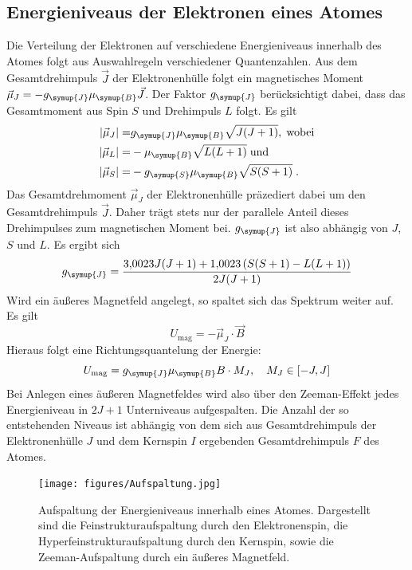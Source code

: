 \subsection{Energieniveaus der Elektronen eines Atomes}
%
Die Verteilung der Elektronen auf verschiedene Energieniveaus innerhalb des
Atomes folgt aus Auswahlregeln verschiedener Quantenzahlen. Aus dem
Gesamtdrehimpuls $\vec{J}$ der Elektronenhülle folgt ein magnetisches Moment
$\vec{\mu}_J=-g_{\symup{J}}\mu_{\symup{B}}\vec{J}$. Der Faktor $g_{\symup{J}}$
berücksichtigt dabei, dass das Gesamtmoment aus Spin $S$ und Drehimpuls $L$
folgt. Es gilt
%
\begin{align*}
  |\vec{\mu}_J|=&g_{\symup{J}}\mu_{\symup{B}}\sqrt{J(J+1)},\;\text{wobei} \\
  |\vec{\mu}_L|=&-\mu_{\symup{B}}\sqrt{L(L+1)}\;\text{und} \\
  |\vec{\mu}_S|=&-g_{\symup{S}}\mu_{\symup{B}}\sqrt{S(S+1)}\;.
\end{align*}
%
Das Gesamtdrehmoment $\vec{\mu}_J$ der Elektronenhülle präzediert dabei um den
Gesamtdrehimpuls $\vec{J}$. Daher trägt stets nur der parallele Anteil dieses
Drehimpulses zum magnetischen Moment bei. $g_{\symup{J}}$ ist also abhängig von
$J$, $S$ und $L$. Es ergibt sich
%
\begin{equation}
  g_{\symup{J}}=\frac{\num{3.0023}J(J+1)+\num{1.0023}\left(S(S+1)-L(L+1)\right)}{2J(J+1)}
  \label{eq:gj}
\end{equation}
%
Wird ein äußeres Magnetfeld angelegt, so spaltet sich das
Spektrum weiter auf. Es gilt
%
\begin{equation}
  U_\text{mag}=-\vec{\mu}_J\cdot\vec{B}
\end{equation}
%
Hieraus folgt eine Richtungsquantelung der Energie:
%
\begin{equation}
  U_\text{mag}=g_{\symup{J}}\mu_{\symup{B}}B\cdot M_J,\quad M_J\in[-J,J]
\end{equation}
%
Bei Anlegen eines äußeren Magnetfeldes wird also über den Zeeman-Effekt jedes
Energieniveau in $2J+1$ Unterniveaus aufgespalten. Die Anzahl der so
entstehenden Niveaus ist abhängig von dem sich aus Gesamtdrehimpuls der
Elektronenhülle $J$ und dem Kernspin $I$ ergebenden Gesamtdrehimpuls $F$ des
Atomes.
%
\begin{figure}[htb]
  \centering
  \texttt{[image: figures/Aufspaltung.jpg]}
  \caption{Aufspaltung der Energieniveaus innerhalb eines Atomes. Dargestellt
  sind die Feinstrukturaufspaltung durch den Elektronenspin, die
  Hyperfeinstrukturaufspaltung durch den Kernspin, sowie die Zeeman-Aufspaltung
  durch ein äußeres Magnetfeld.}
  \label{fig:aufspaltung}
\end{figure}

